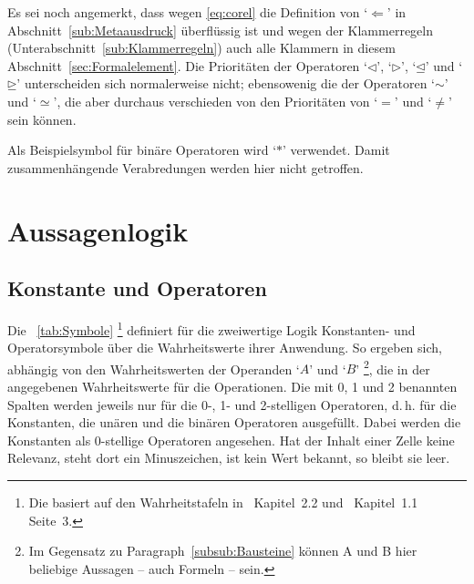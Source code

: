 \documentclass[english,ngerman,parskip=half,headsepline,footsepline,
	fleqn,notitlepage]{scrreprt}
\makeatletter
\newcommand*{\texthead}[1]{\textnormal{\textsf{\textbf{#1}}}}%
\newcommand*{\Lohead}[1]{\lohead{\texthead{#1}}}
\newcommand*{\Cohead}[1]{\cohead{\texthead{#1}}}
\newcommand*{\Pagestyle}{\pagestyle{scrheadings}}
\newcommand*{\beginsection}[1]{%
	\Cohead{#1}%
	\Lohead{\sectionname~\thesection}%
	\Pagestyle%
}
\newcommand*{\metarep}{\Leftarrow}%
\newcommand*{\opbsp}{\ast}
\newcommand*{\relbsp}{\sim}
\newcommand*{\releqbsp}{\simeq}
\newcommand*{\lrelbsp}{\lhd}
\newcommand*{\rrelbsp}{\rhd}
\newcommand*{\lreleqbsp}{\unlhd}
\newcommand*{\rreleqbsp}{\unrhd}
\newcommand*{\charqt}[1]{\enquote*{#1}}%
\newcommand*{\symqt}[1]{\charqt{#1}}%
\newcommand*{\sectionname}{Abschnitt}
\newcommand*{\subsectionname}{Unterabschnitt}
\newcommand*{\subsubsectionname}{Paragraph}
\newcommand*{\textdh}{d.\@\,h.\@ }
\makeatother
\begin{document}
	Es sei noch angemerkt, dass wegen \vref{eq:corel}
	die Definition von \symqt{$\metarep$} in \sectionname~\vref{sub:Metaausdruck}
	überflüssig ist
	und wegen der Klammerregeln
	(\seename \subsectionname~\vref{sub:Klammerregeln})
	auch alle Klammern in diesem \sectionname~\ref{sec:Formalelement}.
	Die Prioritäten der Operatoren \symqt{$\lrelbsp$}, \symqt{$\rrelbsp$},
	\symqt{$\lreleqbsp$} und \symqt{$\rreleqbsp$}
	unterscheiden sich normalerweise nicht;
	ebensowenig die der Operatoren \symqt{$\relbsp$} und \symqt{$\releqbsp$},
	die aber durchaus verschieden von den Prioritäten
	von \symqt{$=$} und \symqt{$\ne$} sein können.

	Als Beispielsymbol für binäre Operatoren wird \symqt{$\opbsp$} verwendet.
	Damit zusammenhängende Verabredungen werden hier nicht getroffen.

	\section{Aussagenlogik}%
	\beginsection{Aussagenlogik}
	\label{sec:Aussagenlogik}

	\subsection{Konstante und Operatoren}%
	\label{sub:Operatoren}

	Die \tablename~\vref{tab:Symbole}
	\footnote{%
		Die \tablename{} basiert auf den Wahrheitstafeln in~\cite{bib:Junktor}
		Kapitel~2.2 und~\cite{bib:Rautenberg} Kapitel~1.1 Seite~3.%
	}
	definiert für die zweiwertige Logik Konstanten- und Operatorsymbole
	über die Wahrheitswerte ihrer Anwendung.
	So ergeben sich,
	abhängig von den Wahrheitswerten der Operanden \symqt{$A$} und \symqt{$B$}
	\footnote{%
		Im Gegensatz zu \subsubsectionname~\vref{subsub:Bausteine}
		können A und B hier beliebige Aussagen -- auch Formeln -- sein.%
	},
	die in der \tablename{} angegebenen Wahrheitswerte für die Operationen.
	Die mit 0, 1 und 2 benannten Spalten werden jeweils
	nur für die 0-, 1- und 2-stelligen Operatoren, \textdh
	für die Konstanten, die unären und die binären Operatoren ausgefüllt.
	Dabei werden die Konstanten als 0-stellige Operatoren angesehen.
	Hat der Inhalt einer Zelle keine Relevanz, steht dort ein Minuszeichen,
	ist kein Wert bekannt, so bleibt sie leer.
\end{document}

